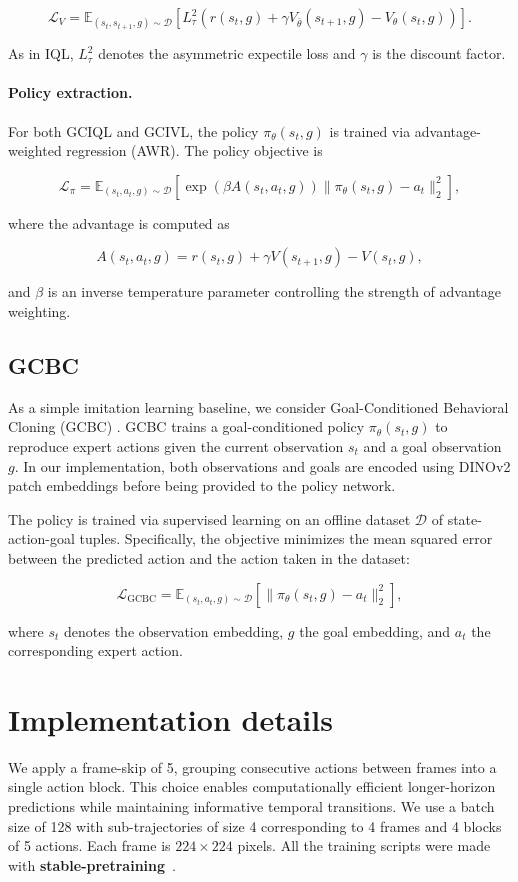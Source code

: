 \[
\mathcal{L}_{V} =
\mathbb{E}_{(s_t, s_{t+1}, g) \sim \mathcal{D}}
\left[
L_\tau^2
\left(
r(s_t, g) + \gamma V_{\bar{\theta}}(s_{t+1}, g)
-
V_\theta(s_t, g)
\right)
\right].
\]

As in IQL, $L_\tau^2$ denotes the asymmetric expectile loss and $\gamma$ is the discount factor.

\paragraph{Policy extraction.}

For both GCIQL and GCIVL, the policy $\pi_\theta(s_t, g)$ is trained via advantage-weighted regression (AWR). The policy objective is

\[
\mathcal{L}_{\pi} =
\mathbb{E}_{(s_t, a_t, g) \sim \mathcal{D}}
\left[
\exp\left(\beta A(s_t, a_t, g)\right)
\|
\pi_\theta(s_t, g) - a_t
\|_2^2
\right],
\]

where the advantage is computed as

\[
A(s_t, a_t, g) =
r(s_t, g) + \gamma V(s_{t+1}, g) - V(s_t, g),
\]

and $\beta$ is an inverse temperature parameter controlling the strength of advantage weighting.

\subsection{GCBC}

As a simple imitation learning baseline, we consider Goal-Conditioned Behavioral Cloning (GCBC) \cite{ghosh2019learning}. GCBC trains a goal-conditioned policy $\pi_\theta(s_t, g)$ to reproduce expert actions given the current observation $s_t$ and a goal observation $g$. In our implementation, both observations and goals are encoded using DINOv2 patch embeddings before being provided to the policy network.

The policy is trained via supervised learning on an offline dataset $\mathcal{D}$ of state-action-goal tuples. Specifically, the objective minimizes the mean squared error between the predicted action and the action taken in the dataset:

\[
\mathcal{L}_{\text{GCBC}} =
\mathbb{E}_{(s_t, a_t, g) \sim \mathcal{D}}
\left[
\|
\pi_\theta(s_t, g) - a_t
\|_2^2
\right],
\]

where $s_t$ denotes the observation embedding, $g$ the goal embedding, and $a_t$ the corresponding expert action.


\section{Implementation details}
\label{appendix:details}
We apply a frame-skip of 5, grouping consecutive actions between frames into a single action block. This choice enables computationally efficient longer-horizon predictions while maintaining informative temporal transitions. 
We use a batch size of 128 with sub-trajectories of size 4 corresponding to 4 frames and 4 blocks of 5 actions. Each frame is $224\times224$ pixels.  All the training scripts were made with \textbf{stable-pretraining}~\cite{balestriero2025spt}.

